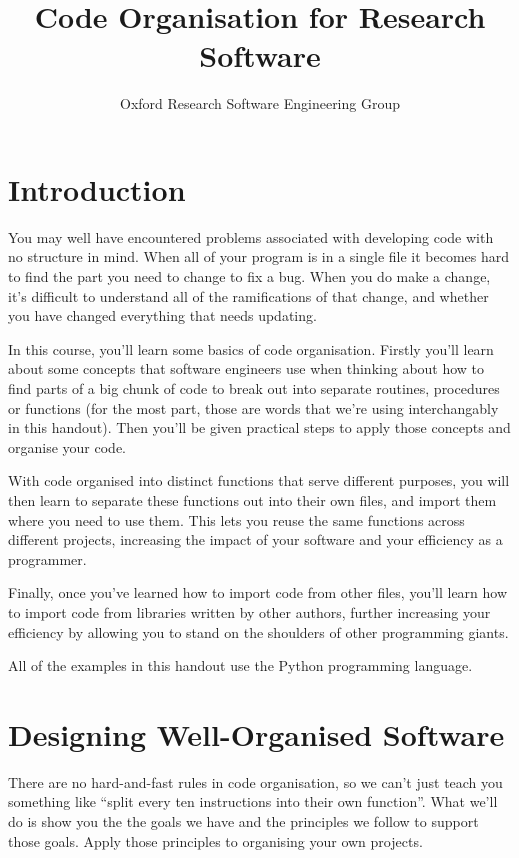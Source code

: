\documentclass[a4paper]{article}
\begin{document}
\title{Code Organisation for Research Software}
\author{Oxford Research Software Engineering Group}
\maketitle

\section{Introduction}
You may well have encountered problems associated with developing code with no structure in mind. When all of your program is in a single file it becomes hard to find the part you need to change to fix a bug. When you do make a change, it's difficult to understand all of the ramifications of that change, and whether you have changed everything that needs updating.

In this course, you'll learn some basics of code organisation. Firstly you'll learn about some concepts that software engineers use when thinking about how to find parts of a big chunk of code to break out into separate routines, procedures or functions (for the most part, those are words that we're using interchangably in this handout). Then you'll be given practical steps to apply those concepts and organise your code.

With code organised into distinct functions that serve different purposes, you will then learn to separate these functions out into their own files, and import them where you need to use them. This lets you reuse the same functions across different projects, increasing the impact of your software and your efficiency as a programmer.

Finally, once you've learned how to import code from other files, you'll learn how to import code from libraries written by other authors, further increasing your efficiency by allowing you to stand on the shoulders of other programming giants.

All of the examples in this handout use the Python programming language.

\section{Designing Well-Organised Software}

There are no hard-and-fast rules in code organisation, so we can't just teach you something like ``split every ten instructions into their own function''. What we'll do is show you the the goals we have and the principles we follow to support those goals. Apply those principles to organising your own projects.
\end{document}
